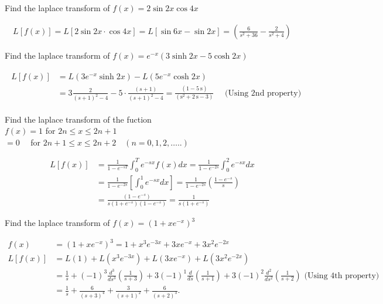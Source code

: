 \begin{exercise}
	Find the laplace transform of $f(x)=2 \sin 2 x \cos 4 x$
\end{exercise}
\begin{answer}
	\begin{align*}
	L[f(x)]=L[2 \sin 2 x \cdot \cos 4 x]=L[\sin 6 x-\sin 2 x]=\left(\frac{6}{s^{2}+36}-\frac{2}{s^{2}+4}\right)
	\end{align*}
\end{answer}
\begin{exercise}
	Find the laplace transform of $f(x)=e^{-x}(3 \sinh 2 x-5 \cosh 2 x)$
\end{exercise}
\begin{answer}
	\begin{align*}
	\begin{aligned}
	L[f(x)] &=L\left(3 e^{-x} \sinh 2 x\right)-L\left(5 e^{-x} \cosh 2 x\right) \\
	&=3 \frac{2}{(s+1)^{2}-4}-5 \cdot \frac{(s+1)}{(s+1)^{2}-4}=\frac{(1-5 \mathrm{~s})}{\left(\mathrm{s}^{2}+2 \mathrm{~s}-3\right)} \quad \text { (Using 2nd property) }
	\end{aligned}
	\end{align*}
\end{answer}
\begin{exercise}
	Find the laplace transform of the fuction\\
	$f(x)=1$ for $2 n \leq x \leq 2 n+1$\\
	$=0 \quad$ for $2 n+1 \leq x \leq 2 n+2 \quad(n=0,1,2, \ldots . .)$
\end{exercise}
\begin{answer}
	\begin{align*}
	L[f(x)] &=\frac{1}{1-e^{-s T}} \int_{0}^{T} e^{-s x} f(x) d x=\frac{1}{1-e^{-2 s}} \int_{0}^{2} e^{-s x} d x \\
	&=\frac{1}{1-e^{-2 s}}\left[\int_{0}^{1} e^{-s x} d x\right]=\frac{1}{1-e^{-2 s}}\left(\frac{1-e^{-s}}{s}\right)\\
	&=\frac{\left(1-e^{-s}\right)}{s\left(1+e^{-s}\right)\left(1-e^{-s}\right)}=\frac{1}{s\left(1+e^{-s}\right)}
	\end{align*}
\end{answer}
\begin{exercise}
	Find the laplace transform of $f(x)=\left(1+x e^{-x}\right)^{3}$
\end{exercise}
\begin{answer}
	\begin{align*}
	f(x)&=\left(1+x e^{-x}\right)^{3}=1+x^{3} e^{-3 x}+3 x e^{-x}+3 x^{2} e^{-2 x} \\
	L[f(x)]&=L(1)+L\left(x^{3} e^{-3 x}\right)+L\left(3 x e^{-x}\right)+L\left(3 x^{2} e^{-2 x}\right)\\
	&=\frac{1}{s}+(-1)^{3} \frac{d^{3}}{d s^{3}}\left(\frac{1}{s+3}\right)+3(-1)^{1} \frac{d}{d s}\left(\frac{1}{s+1}\right)+3(-1)^{2} \frac{d^{2}}{d s^{2}}\left(\frac{1}{s+2}\right)\text{ (Using 4th property)}\\
	&=\frac{1}{s}+\frac{6}{(s+3)^{4}}+\frac{3}{(s+1)^{2}}+\frac{6}{(s+2)^{3}} \text {. }
	\end{align*}
\end{answer}
